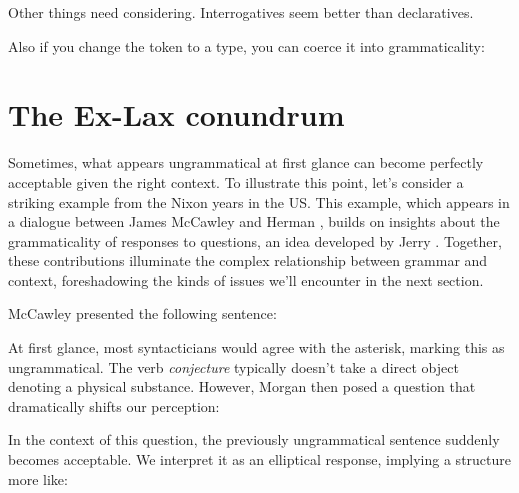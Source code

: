 Other things need considering. Interrogatives seem better than declaratives.

\ea
    \z
\z

Also if you change the token to a type, you can coerce it into grammaticality:

\ea
    \z
\z

\section{The Ex-Lax conundrum}

Sometimes, what appears ungrammatical at first glance can become perfectly acceptable given the right context. To illustrate this point, let's consider a striking example from the Nixon years in the US. This example, which appears in a dialogue between James McCawley and Herman  \citet[252]{Parret1974}, builds on insights about the grammaticality of responses to questions, an idea developed by Jerry \citet{Morgan1973}. Together, these contributions illuminate the complex relationship between grammar and context, foreshadowing the kinds of issues we'll encounter in the next section.

McCawley presented the following sentence:

\label{ex:spiro-ex-lax}\z

At first glance, most syntacticians would agree with the asterisk, marking this as ungrammatical. The verb \textit{conjecture} typically doesn't take a direct object denoting a physical substance. However, Morgan then posed a question that dramatically shifts our perception:

\label{ex:pat-nixon-cakes}\z

In the context of this question, the previously ungrammatical sentence suddenly becomes acceptable. We interpret it as an elliptical response, implying a structure more like:

\label{ex:spiro-full}\z

